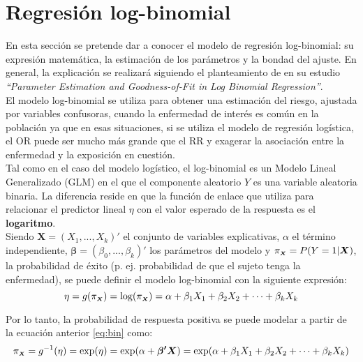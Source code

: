 \section{Regresión log-binomial}\label{cap:logbinom}
En esta sección se pretende dar a conocer el modelo de regresión log-binomial: su expresión matemática, la estimación de los parámetros y la bondad del ajuste. En general, la explicación se realizará siguiendo el planteamiento de \textcite{logbinom1} en su estudio \textit{``Parameter Estimation and Goodness-of-Fit in Log Binomial Regression''}.\\

El modelo log-binomial se utiliza para obtener una estimación del riesgo, ajustada por variables confusoras, cuando la enfermedad de interés es común en la población ya que en esas situaciones, si se utiliza el modelo de regresión logística, el OR puede ser mucho más grande que el RR y exagerar la asociación entre la enfermedad y la exposición en cuestión.\\

Tal como en el caso del modelo logístico, el log-binomial es un Modelo Lineal Generalizado (GLM) en el que el componente aleatorio $Y$ es una variable aleatoria binaria. La diferencia reside en que la función de enlace que utiliza para relacionar el predictor lineal $\eta$ con el valor esperado de la respuesta es el \textbf{logaritmo}. \\

Siendo $\boldsymbol{X}= (X_1,...,X_k)'$ el conjunto de variables explicativas, $\alpha$ el término independiente, $\boldsymbol{\beta}=(\beta_0,...,\beta_k)'$ los parámetros del modelo y $\pi_{\mathsmaller{\boldsymbol{X}}}=P(Y=1|\boldsymbol{X})$, la probabilidad de éxito (p. ej. probabilidad de que el sujeto tenga la enfermedad), se puede definir el modelo log-binomial con la siguiente expresión:
\begin{equation}
\label{eq:bin}
\eta=g(\pi_{\mathsmaller{\boldsymbol{X}}})=\log(\pi_{\mathsmaller{\boldsymbol{X}}})=\alpha + \beta_1X_1 + \beta_2X_2 + \cdots + \beta_kX_k
\end{equation}

Por lo tanto, la probabilidad de respuesta positiva se puede modelar a partir de la ecuación anterior \eqref{eq:bin} como:
\begin{equation}
\label{eq:pi_bin}
\pi_{\mathsmaller{\boldsymbol{X}}}=g^{-1}(\eta)=\exp(\eta)=\exp(\alpha +\boldsymbol{\beta'X})=\exp(\alpha + \beta_1X_1 + \beta_2X_2 + \cdots + \beta_kX_k)
\end{equation}

